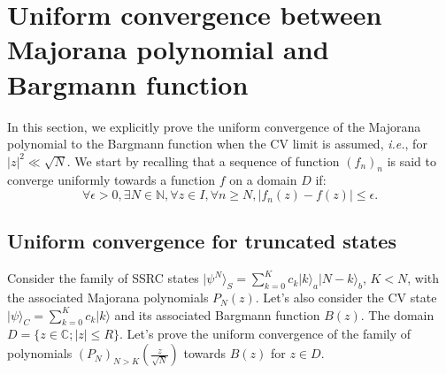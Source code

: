 \documentclass[aps,prl,showpacs,twocolumn]{revtex4-2}
\providecommand{\abs}[1]{\left\lvert#1\right\rvert}
\providecommand{\ket}[1]{\lvert #1 \rangle}
\providecommand{\abs}[1]{\left\lvert#1\right\rvert}
\providecommand{\ket}[1]{\lvert #1 \rangle}
\providecommand{\abs}[1]{\left\lvert#1\right\rvert}
\providecommand{\ket}[1]{\lvert #1 \rangle}
\providecommand{\abs}[1]{\left\lvert#1\right\rvert}
\providecommand{\ket}[1]{\lvert #1 \rangle}
\begin{document}
\section{Uniform convergence between Majorana polynomial and Bargmann function}

In this section, we explicitly prove the uniform convergence of the Majorana polynomial to the Bargmann function when the CV limit is assumed, {\it i.e.}, for $\abs{z}^2 \ll \sqrt{N}$. We start by recalling that a sequence of function $(f_n)_n$ is said to converge uniformly towards a function $f$ on a domain $D$ if:
\begin{equation}
    \forall \epsilon>0, \exists N \in \mathbb{N}, \forall z\in I, \forall n \geq N, |f_n(z)-f(z)|\leq \epsilon.
\end{equation}


\subsection{Uniform convergence for truncated states }
\label{sec:UniformCov}
Consider the family of SSRC states $\ket{\psi^N}_{S } =\sum_{k=0}^{K} c_k \ket{k}_a\ket{N-k}_b$, $K<N$, with the associated Majorana polynomials $P_N(z)$. Let's also consider the CV state  $\ket{\psi}_{C} = \sum_{k=0}^{K} c_k \ket{k}$ and its associated Bargmann function $B(z)$. The domain $D=\{ z\in \mathbb{C}; |z|\leq R\}$.
Let's prove the uniform convergence of the family of polynomials $(P_N)_{N>K}\left(\frac{z}{\sqrt{N}}\right)$ towards $B(z)$ for $z\in D$.
\end{document}
